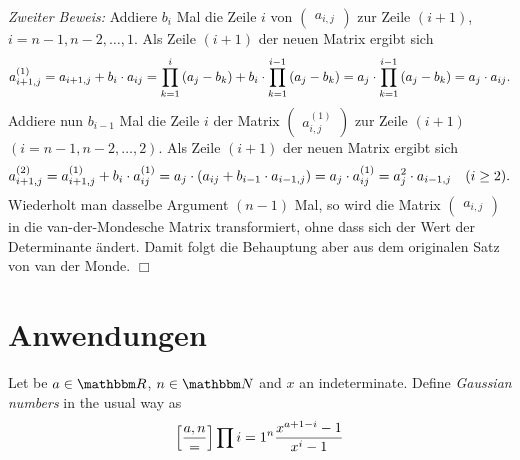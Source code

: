 \documentclass[11pt,a4paper]{article}
\begin{document}
\emph{Zweiter Beweis:} Addiere $b_i$ Mal die Zeile $i$ von $\begin{pmatrix}
  a_{i,j}\end{pmatrix}$ zur Zeile $(i+1)$, $i=n-1,n-2,\dots,1$. Als Zeile
$(i+1)$ der neuen Matrix ergibt sich 
\begin{gather*}
  a_{i+1,j}^{(1)}=a_{i+1,j}+b_i\cdot a_{ij}
  =\prod_{k=1}^i\left(a_j-b_k\right)+b_i\cdot\prod_{k=1}^{i-1}\left(a_j-b_k\right) 
  =a_j\cdot \prod_{k=1}^{i-1}\left(a_j-b_k\right) = a_j\cdot a_{ij}.
\end{gather*}
Addiere nun $b_{i-1}$ Mal die Zeile $i$ der Matrix $\begin{pmatrix}
  a_{i,j}^{(1)}\end{pmatrix}$ zur Zeile $(i+1)$ $(i=n-1,n-2,\dots,2)$.  Als
Zeile $(i+1)$ der neuen Matrix ergibt sich
\begin{gather*}
  a_{i+1,j}^{(2)}=a_{i+1,j}^{(1)}+b_i\cdot a_{ij}^{(1)}
  =a_j\cdot\left(a_{ij}+b_{i-1}\cdot a_{i-1,j}\right) = a_j\cdot a_{ij}^{(1)} =a_j^2\cdot
  a_{i-1,j}\quad (i\ge 2).
\end{gather*}
Wiederholt man dasselbe Argument $(n-1)$ Mal, so wird die Matrix
$\begin{pmatrix} a_{i,j}\end{pmatrix}$ in die van-der-Mondesche Matrix
transformiert, ohne dass sich der Wert der Determinante ändert.  Damit folgt
die Behauptung aber aus dem originalen Satz von van der Monde. \hfill$\Box$

\section{Anwendungen}

\newcommand{\gauss}[2]{\ensuremath\sbr{\frac{#1}{#2}}}

Let be $a\in\R$, $n\in\N$ and $x$ an indeterminate. Define \emph{Gaussian
numbers} in the usual way as
\begin{gather*}
  \gauss{a,n}=\prod{i=1}^n\frac{x^{a+1-i}-1}{x^i-1}
\end{gather*}

\begin{folgerung}
  
\end{folgerung}
\end{document}
